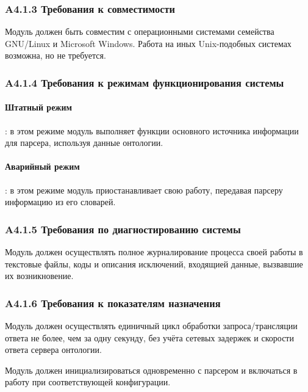 \subsubsection*{A4.1.3 Требования к совместимости}
Модуль должен быть совместим с операционными системами семейства GNU/Linux и Microsoft Windows. Работа на иных Unix-подобных системах возможна, но не требуется.

\subsubsection*{A4.1.4 Требования к режимам функционирования системы}

\paragraph{Штатный режим}: в этом режиме модуль выполняет функции основного источника информации для парсера, используя данные онтологии.

\paragraph{Аварийный режим}: в этом режиме модуль приостанавливает свою работу, передавая парсеру информацию из его словарей.

\subsubsection*{A4.1.5 Требования по диагностированию системы}
Модуль должен осуществлять полное журналирование процесса своей работы в текстовые файлы, коды и описания исключений, входящией данные, вызвавшие их возникновение.

\subsubsection*{A4.1.6 Требования к показателям назначения}

Модуль должен осуществлять единичный цикл обработки запроса/трансляции ответа не более, чем за одну секунду, без учёта сетевых задержек и скорости ответа сервера онтологии.

Модуль должен инициализироваться одновременно с парсером и включаться в работу при соответствующей конфигурации.

